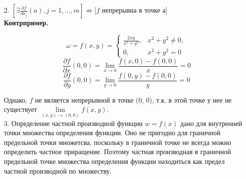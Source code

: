 \documentclass[a4paper,12pt]{article} %
\begin{document}
	2. $\left[\exists \frac{\partial f}{\partial x_j}(a), j = 1, \ldots, m\right] \not\Rightarrow [f$ непрерывна в точке а$]$ \\
	
\textbf{Контрпример.}
	
\begin{equation*}
	\omega = f(x, y) = 
	\begin{cases}
		\frac{2xy}{x^2 + y^2}, & x^2 + y^2 \not=0,\\
		0, & x^2 + y^2 = 0
	\end{cases}
\end{equation*}
\[\frac{\partial f}{\partial x}(0,0) = \lim\limits_{x\to 0} \frac{f(x, 0) - f(0, 0)}{x} = 0\]
\[\frac{\partial f}{\partial y}(0,0) = \lim\limits_{y\to 0} \frac{f(0, y) - f(0, 0)}{y} = 0\]

Однако, $f$ не является непрерывной в точке (0, 0), т.к. в этой точке у нее не существует $\lim\limits_{(x, y) \to (0, 0)} f(x, y)$.\\
	
3. Определение частной производной функции $w = f(x)$ дано для внутренней точки множества определения функции. Оно не пригодно для граничной предельной точки множетсва, поскольку в граничной точке не всегда можно определить частное приращение. Поэтому частная производная в граничной предельной точке множества определения функции находиться как предел частной производной по множеству.
	
\end{document}
